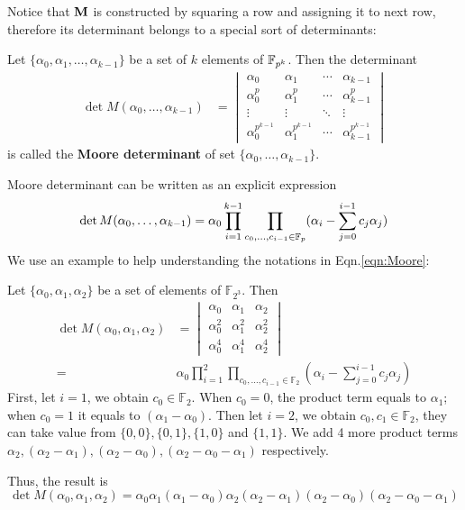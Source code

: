 Notice that ${\bf M}$ is constructed by squaring a row and assigning it to next row,
therefore its determinant belongs to a special sort of determinants:
\begin{Definition}
Let $\{\alpha_0,\alpha_1,\dots,\alpha_{k-1}\}$ be a set of $k$ elements of ${\mathbb{F}}_{p^k}$. Then the determinant
\begin{align}
\det{M(\alpha_0,\dots,\alpha_{k-1})} &= 
\begin{vmatrix}
\alpha_0 & \alpha_1 & \cdots & \alpha_{k-1} \\
\alpha_0^p & \alpha_1^p & \cdots & \alpha_{k-1}^p \\
\vdots & \vdots & \ddots & \vdots \\
\alpha_0^{p^{k-1}} & \alpha_1^{p^{k-1}} & \cdots & \alpha_{k-1}^{p^{k-1}}
\end{vmatrix}
\end{align}
is called the {\bf Moore determinant} of set $\{\alpha_0,\dots,\alpha_{k-1}\}$.
\end{Definition}
Moore determinant can be written as an explicit expression
\begin{equation}
\label{eqn:Moore}
\det{M(\alpha_0,\dots,\alpha_{k-1})} = \alpha_0 \prod_{i=1}^{k-1} \prod_{c_0,\dots,c_{i-1}\in {\mathbb{F}}_{p}} (\alpha_{i} - \sum_{j=0}^{i-1}c_j\alpha_j)
\end{equation}
We use an example to help understanding the notations in Eqn.\ref{eqn:Moore}:
\begin{Example}
Let $\{\alpha_0,\alpha_1,\alpha_2\}$ be a set of elements of $\mathbb F_{2^3}$. Then
\begin{align}
\det{M(\alpha_0,\alpha_1,\alpha_2)} &= 
\begin{vmatrix}
\alpha_0 & \alpha_1 & \alpha_2 \\
\alpha_0^2 & \alpha_1^2 & \alpha_2^2 \\
\alpha_0^4 & \alpha_1^4 & \alpha_2^4
\end{vmatrix} \\ \nonumber
=& \alpha_0 \prod_{i=1}^{2} \prod_{c_0,\dots,c_{i-1}\in \mathbb F_2} (\alpha_{i} - \displaystyle\sum_{j=0}^{i-1}c_j\alpha_j)
\end{align}
First, let $i=1$,  we obtain $c_0\in \mathbb F_2$. When $c_0=0$, the product term equals to $\alpha_1$; when $c_0=1$ it equals to $(\alpha_1-\alpha_0)$.
Then let $i=2$, we obtain ${c_0,c_1}\in \mathbb F_2$, they can take value from $\{0,0\},\{0,1\},\{1,0\}$ and $\{1,1\}$.
We add 4 more product terms $\alpha_2,(\alpha_2-\alpha_1),(\alpha_2-\alpha_0),(\alpha_2-\alpha_0-\alpha_1)$ respectively.

Thus, the result is
\begin{equation}
\det{M(\alpha_0,\alpha_1,\alpha_2)} = \alpha_0\alpha_1(\alpha_1-\alpha_0)\alpha_2(\alpha_2-\alpha_1)(\alpha_2-\alpha_0)(\alpha_2-\alpha_0-\alpha_1)
\end{equation}
\end{Example}

